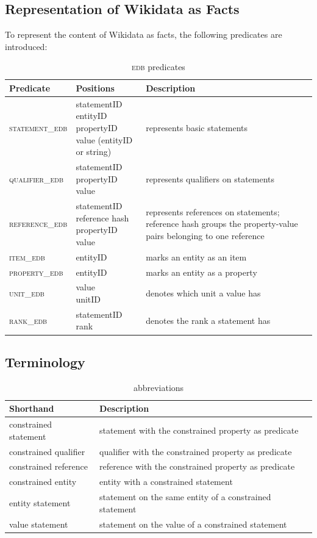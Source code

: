 \documentclass[hyperref,bachelorofscience,fleqn]{cgvpub}
\begin{document}
\subsection{Representation of Wikidata as Facts}\label{subsec_representation}
To represent the content of Wikidata as facts, the following predicates are introduced:
\begin{table}[H]
\caption{\textsc{edb} predicates}\label{tab_predicates}
\begin{tabular}{llp{8.5cm}}
Predicate & Positions & Description \\
\hline
\textsc{statement\_edb} & \makecell{statementID \\ entityID \\ propertyID \\ value (entityID or string)} & represents basic statements \\
\hline
\textsc{qualifier\_edb} & \makecell{statementID \\ propertyID \\ value} & represents qualifiers on statements \\
\hline
\textsc{reference\_edb} & \makecell{statementID \\ reference hash \\ propertyID \\ value} & represents references on statements; reference hash groups the property-value pairs belonging to one reference \\
\hline
\textsc{item\_edb} & entityID & marks an entity as an item \\
\textsc{property\_edb} & entityID & marks an entity as a property \\
\hline
\textsc{unit\_edb} & \makecell{value \\ unitID} & denotes which unit a value has \\
\hline
\textsc{rank\_edb} & \makecell{statementID \\ rank} & denotes the rank a statement has
\end{tabular}
\end{table}

\subsection{Terminology}
\begin{table}[H]
\caption{abbreviations}\label{tab_abbreviations}
\begin{tabular}{ll}
Shorthand & Description \\
\hline
constrained statement & statement with the constrained property as predicate \\
constrained qualifier & qualifier with the constrained property as predicate \\
constrained reference & reference with the constrained property as predicate \\
constrained entity & entity with a constrained statement \\
entity statement & statement on the same entity of a constrained statement \\
value statement & statement on the value of a constrained statement
\end{tabular}
\end{table}
\end{document}
